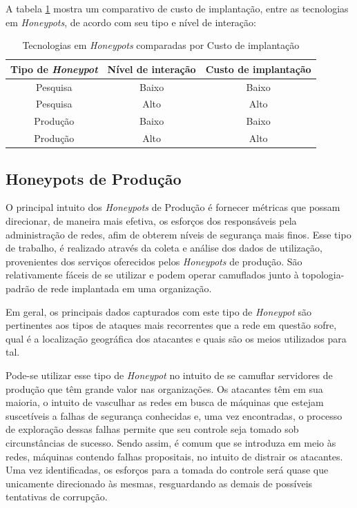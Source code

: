 A tabela \ref{tabela:honeypots_tipo_interacao} mostra um comparativo de custo de implantação, entre as tecnologias em \textit{Honeypots}, de acordo com seu tipo e nível de interação:

\begin{table}[H]
    \begin{center}
        \caption{\label{tabela:honeypots_tipo_interacao}Tecnologias em \textit{Honeypots} comparadas por Custo de implantação}
        \begin{tabular}{c|c|c}
            \hline
            \hline
                \textbf{Tipo de \textit{Honeypot}} & \textbf{Nível de interação} & \textbf{Custo de implantação}\\
            \hline
                Pesquisa & Baixo & Baixo\\
            \hline
                Pesquisa & Alto & Alto\\
            \hline
                Produção & Baixo & Baixo\\
            \hline
                Produção & Alto & Alto\\
            \hline
            \hline
        \end{tabular}
    \end{center}
\end{table}


\subsection{Honeypots de Produção}

O principal intuito dos \textit{Honeypots} de Produção é fornecer métricas que possam direcionar, de maneira mais efetiva, os esforços dos responsáveis pela administração de redes, afim de obterem níveis de segurança mais finos. Esse tipo de trabalho, é realizado através da coleta e análise dos dados de utilização, provenientes dos serviços oferecidos pelos \textit{Honeypots} de produção. São relativamente fáceis de se utilizar e podem operar camuflados junto à topologia-padrão de rede implantada em uma organização.

Em geral, os principais dados capturados com este tipo de \textit{Honeypot} são pertinentes aos tipos de ataques mais recorrentes que a rede em questão sofre, qual é a localização geográfica dos atacantes e quais são os meios utilizados para tal.

Pode-se utilizar esse tipo de \textit{Honeypot} no intuito de se camuflar servidores de produção que têm grande valor nas organizações. Os atacantes têm em sua maioria, o intuito de vasculhar as redes em busca de máquinas que estejam suscetíveis a falhas de segurança conhecidas e, uma vez encontradas, o processo de exploração dessas falhas permite que seu controle seja tomado sob circunstâncias de sucesso. Sendo assim, é comum que se introduza em meio às redes, máquinas contendo falhas propositais, no intuito de distrair os atacantes. Uma vez identificadas, os esforços para a tomada do controle será quase que unicamente direcionado às mesmas, resguardando as demais de possíveis tentativas de corrupção.

